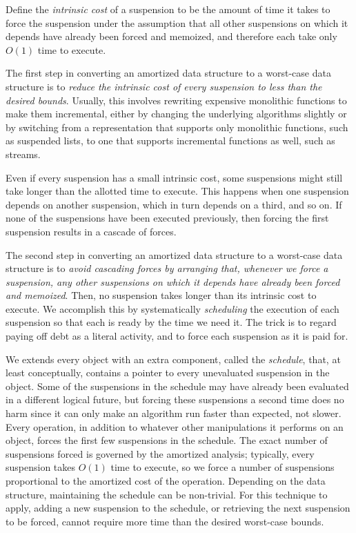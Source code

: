 \documentclass[12pt, a4paper]{article} %
\begin{document}
Define the \textit{intrinsic cost} of a suspension to be the amount of time it takes to force the suspension under the assumption that all other suspensions on which it depends have already been forced and memoized, and therefore each take only $O(1)$ time to execute.

The first step in converting an amortized data structure to a worst-case data structure is to \textit{reduce the intrinsic cost of every suspension to less than the desired bounds}. Usually, this involves rewriting expensive monolithic functions to make them incremental, either by changing the underlying algorithms slightly or by switching from a representation that supports only monolithic functions, such as suspended lists, to one that supports incremental functions as well, such as streams.

Even if every suspension has a small intrinsic cost, some suspensions might still take longer than the allotted time to execute. This happens when one suspension depends on another suspension, which in turn depends on a third, and so on. If none of the suspensions have been executed previously, then forcing the first suspension results in a cascade of forces.

The second step in converting an amortized data structure to a worst-case data structure is to \textit{avoid cascading forces by arranging that, whenever we force a suspension, any other suspensions on which it depends have already been forced and memoized}. Then, no suspension takes longer than its intrinsic cost to execute. We accomplish this by systematically \textit{scheduling} the execution of each suspension so that each is ready by the time we need it. The trick is to regard paying off debt as a literal activity, and to force each suspension as it is paid for.

We extends every object with an extra component, called the \textit{schedule}, that, at least conceptually, contains a pointer to every unevaluated suspension in the object. Some of the suspensions in the schedule may have already been evaluated in a different logical future, but forcing these suspensions a second time does no harm since it can only make an algorithm run faster than expected, not slower. Every operation, in addition to whatever other manipulations it performs on an object, forces the first few suspensions in the schedule. The exact number of suspensions forced is governed by the amortized analysis; typically, every suspension takes $O(1)$ time to execute, so we force a number of suspensions proportional to the amortized cost of the operation. Depending on the data structure, maintaining the schedule can be non-trivial. For this technique to apply, adding a new suspension to the schedule, or retrieving the next suspension to be forced, cannot require more time than the desired worst-case bounds.
\end{document}
